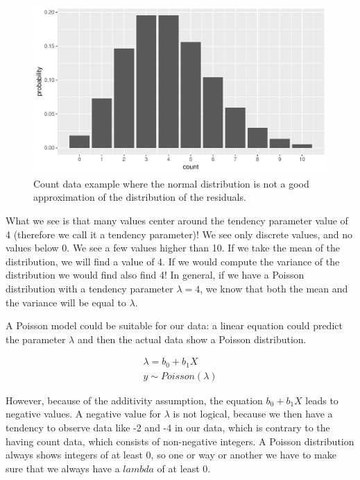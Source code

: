 \documentclass[]{report}\usepackage[]{graphicx}\usepackage[]{color}
\makeatletter
\def\maxwidth{ %
  \ifdim\Gin@nat@width>\linewidth
    \linewidth
  \else
    \Gin@nat@width
  \fi
}
\newenvironment{knitrout}{}{} %
\makeatother
\begin{document}
\begin{knitrout}
\color{fgcolor}\begin{figure}

{\centering \includegraphics[width=\maxwidth]{figure/gen_15-1} 

}

\caption[Count data example where the normal distribution is not a good approximation of the distribution of the residuals]{Count data example where the normal distribution is not a good approximation of the distribution of the residuals.}\label{fig:gen_15}
\end{figure}


\end{knitrout}

What we see is that many values center around the tendency parameter value of 4 (therefore we call it a tendency parameter)! We see only discrete values, and no values below 0. We see a few values higher than 10. If we take the mean of the distribution, we will find a value of 4. If we would compute the variance of the distribution we would find also find 4! In general, if we have a Poisson distribution with a tendency parameter $\lambda=4$, we know that both the mean and the variance will be equal to $\lambda$.

A Poisson model could be suitable for our data: a linear equation could predict the parameter $\lambda$ and then the actual data show a Poisson distribution.


\begin{eqnarray}
\lambda = b_0 + b_1 X \\
y \sim Poisson(\lambda)
\end{eqnarray}

However, because of the additivity assumption, the equation $b_0 + b_1 X$ leads to negative values. A negative value for $\lambda$ is not logical, because we then have a tendency to observe data like -2 and -4 in our data, which is contrary to the having count data, which consists of non-negative integers. A Poisson distribution always shows integers of at least 0, so one or way or another we have to make sure that we always have a $lambda$ of at least 0.
\end{document}

